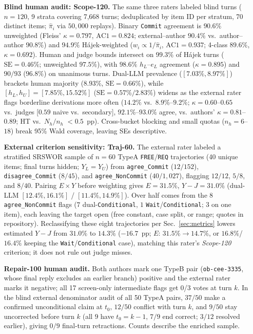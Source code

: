 \documentclass[conference,letterpaper,10pt]{IEEEtran}
\newcommand{\pFREE}{\texttt{FREE}}
\newcommand{\pREQ}{\texttt{REQ}}
\newcommand{\TA}{TypeA}
\newcommand{\TB}{TypeB}
\begin{document}
\textbf{Blind human audit: Scope-120.} The same three raters labeled blind turns ($n{=}120$, 9 strata covering 7,668 turns; deduplicated by item ID per stratum, 70 distinct items; $\hat{\pi}_i$ via $50{,}000$ replays). Binary \texttt{Commit} agreement is $90.6\%$ unweighted (Fleiss' $\kappa{=}0.797$, $\mathrm{AC1}{=}0.824$; external--author $90.4\%$ vs.\ author--author $90.8\%$) and $94.9\%$ H\'{a}jek-weighted ($w_i{\propto}1/\hat{\pi}_i$, $\mathrm{AC1}{=}0.937$; 4-class $89.6\%$, $\kappa{=}0.692$). Human and judge bounds intersect on $99.3\%$ of H\'{a}jek turns ($\mathrm{SE}{=}0.46\%$; unweighted $97.5\%$), with $98.6\%$ $h_L$--$e_L$ agreement ($\kappa{=}0.895$) and $90/93$ ($96.8\%$) on unanimous turns. Dual-LLM prevalence ($[7.03\%,8.97\%]$) brackets human majority ($8.93\%$, $\mathrm{SE}{=}0.66\%$), while $[h_L,h_U]{=}[7.85\%,15.52\%]$ ($\mathrm{SE}{=}0.57\%/2.83\%$) widens as the external rater flags borderline derivations more often ($14.2\%$ vs.\ $8.9\%$--$9.2\%$; $\kappa{=}0.60$--$0.65$ vs.\ judges [$0.59$ naive vs.\ secondary], $92.1\%$--$93.0\%$ agree, vs.\ authors' $\kappa{=}0.81$--$0.89$; HT vs.\ $N_h/n_h$ ${<}0.5$~pp). Cross-bucket blocking and small quotas ($n_h{=}6$--$18$) break 95\% Wald coverage, leaving SEs descriptive.

\textbf{External criterion sensitivity: Traj-60.} The external rater labeled a stratified SRSWOR sample of $n{=}60$ \TA{} \pFREE/\pREQ{} trajectories (40 unique items; final turns hidden; $Y_L{=}Y_U$) from \texttt{agree\_Commit} ($12/152$), \texttt{disagree\_Commit} ($8/45$), and \texttt{agree\_NonCommit} ($40/1{,}027$), flagging $12/12$, $5/8$, and $8/40$. Pairing $E{\times}Y$ before weighting gives $E{=}31.5\%$, $Y{-}J{=}31.0\%$ (dual-LLM $[12.4\%,16.1\%]$ / $[11.4\%,14.9\%]$). Over half comes from the $8$ \texttt{agree\_NonCommit} flags ($7$ dual-\texttt{Conditional}, $1$ \texttt{Wait}/\texttt{Conditional}; $3$ on one item), each leaving the target open (free constant, case split, or range; quotes in repository). Reclassifying these eight trajectories per Sec.~\ref{sec:metrics} lowers estimated $Y{-}J$ from $31.0\%$ to $14.3\%$ ($-16.7$~pp; $E$: $31.5\%\to14.7\%$, or $16.8\%$/$16.4\%$ keeping the \texttt{Wait}/\texttt{Conditional} case), matching this rater's \emph{Scope-120} criterion; it does not rule out judge misses.

\textbf{Repair-100 human audit.} Both authors mark one \TB{} pair (\texttt{ob-cee-3335}, whose final reply excludes an earlier branch) positive and the external rater marks it negative; all 17 screen-only intermediate flags get 0/3 votes at turn $k$. In the blind external denominator audit of all 50 \TA{} pairs, $37/50$ make a confirmed unconditional claim at $t_0$, $12/50$ conflict with turn $k$, and $9/50$ stay uncorrected before turn $k$ (all $9$ have $t_0{=}k{-}1$, $7/9$ end correct; $3/12$ resolved earlier), giving $0/9$ final-turn retractions. Counts describe the enriched sample.
\end{document}
